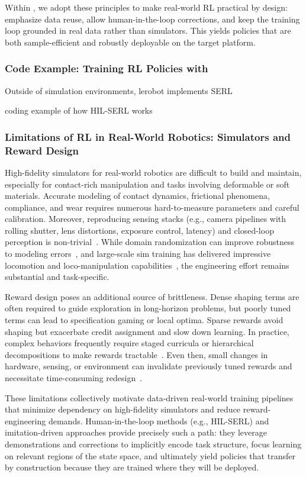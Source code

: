 Within \lerobot, we adopt these principles to make real-world RL practical by design: emphasize data reuse, allow human-in-the-loop corrections, and keep the training loop grounded in real data rather than simulators. This yields policies that are both sample-efficient and robustly deployable on the target platform.

\subsubsection{Code Example: Training RL Policies with \lerobot}
Outside of simulation environments, lerobot implements SERL

coding example of how HIL-SERL works

\subsubsection{Limitations of RL in Real-World Robotics: Simulators and Reward Design}
High-fidelity simulators for real-world robotics are difficult to build and maintain, especially for contact-rich manipulation and tasks involving deformable or soft materials. Accurate modeling of contact dynamics, frictional phenomena, compliance, and wear requires numerous hard-to-measure parameters and careful calibration. Moreover, reproducing sensing stacks (e.g., camera pipelines with rolling shutter, lens distortions, exposure control, latency) and closed-loop perception is non-trivial~\citep{bekrisStateRobotMotion2024,sicilianoSpringerHandbookRobotics2016}. While domain randomization can improve robustness to modeling errors~\citep{akkayaSolvingRubiksCube2019}, and large-scale sim training has delivered impressive locomotion and loco-manipulation capabilities~\citep{hwangboLearningAgileDynamic2019,leeLearningQuadrupedalLocomotion2020,jiDribbleBotDynamicLegged2023}, the engineering effort remains substantial and task-specific.

Reward design poses an additional source of brittleness. Dense shaping terms are often required to guide exploration in long-horizon problems, but poorly tuned terms can lead to specification gaming or local optima. Sparse rewards avoid shaping but exacerbate credit assignment and slow down learning. In practice, complex behaviors frequently require staged curricula or hierarchical decompositions to make rewards tractable~\citep{zhangWoCoCoLearningWholeBody2024,leeLearningQuadrupedalLocomotion2020}. Even then, small changes in hardware, sensing, or environment can invalidate previously tuned rewards and necessitate time-consuming redesign~\citep{tangDeepReinforcementLearning2025a}.

These limitations collectively motivate data-driven real-world training pipelines that minimize dependency on high-fidelity simulators and reduce reward-engineering demands. Human-in-the-loop methods (e.g., HIL-SERL) and imitation-driven approaches provide precisely such a path: they leverage demonstrations and corrections to implicitly encode task structure, focus learning on relevant regions of the state space, and ultimately yield policies that transfer by construction because they are trained where they will be deployed.
